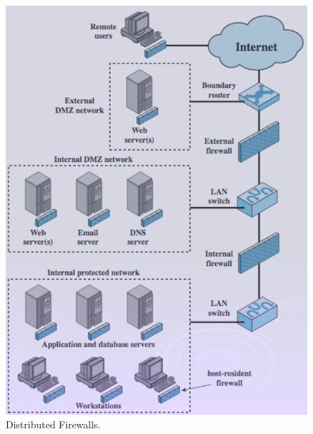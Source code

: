\documentclass[11pt, a4paper, twoside, italian]{report}
\theoremstyle{plain}
\begin{document}
\begin{multicols}{2}
\begin{figure}[H]
		\includegraphics[scale=0.57]{firewalldist}
		\caption*{Distributed Firewalls.}
	\end{figure}
\end{multicols}
\end{document}
